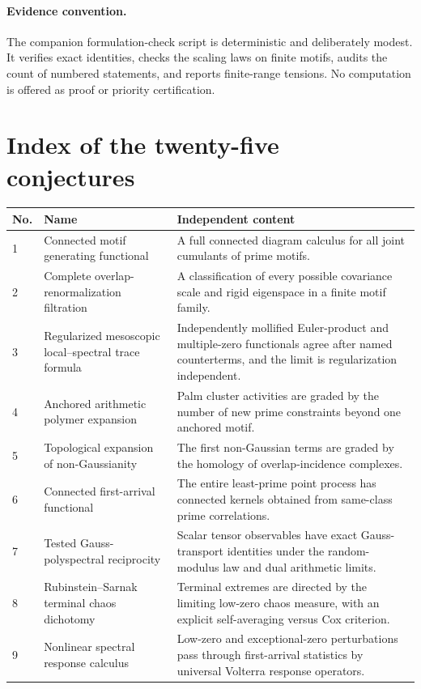 \documentclass[11pt]{article}
\begin{document}
\paragraph{Evidence convention.}
The companion formulation-check script is deterministic and deliberately modest.  It verifies
exact identities, checks the scaling laws on finite motifs, audits the count of
numbered statements, and reports finite-range tensions.  No computation is offered as proof or
priority certification.

\section{Index of the twenty-five conjectures}

\begin{longtable}{@{}p{}p{}p{}@{}}
\toprule
No. & Name & Independent content \\
\midrule
\endhead
1 & Connected motif generating functional & A full connected diagram calculus for all joint cumulants of prime motifs.\\
2 & Complete overlap-renormalization filtration & A classification of every possible covariance scale and rigid eigenspace in a finite motif family.\\
3 & Regularized mesoscopic local--spectral trace formula & Independently mollified Euler-product and multiple-zero functionals agree after named counterterms, and the limit is regularization independent.\\
4 & Anchored arithmetic polymer expansion & Palm cluster activities are graded by the number of new prime constraints beyond one anchored motif.\\
5 & Topological expansion of non-Gaussianity & The first non-Gaussian terms are graded by the homology of overlap-incidence complexes.\\
6 & Connected first-arrival functional & The entire least-prime point process has connected kernels obtained from same-class prime correlations.\\
7 & Tested Gauss-polyspectral reciprocity & Scalar tensor observables have exact Gauss-transport identities under the random-modulus law and dual arithmetic limits.\\
8 & Rubinstein--Sarnak terminal chaos dichotomy & Terminal extremes are directed by the limiting low-zero chaos measure, with an explicit self-averaging versus Cox criterion.\\
9 & Nonlinear spectral response calculus & Low-zero and exceptional-zero perturbations pass through first-arrival statistics by universal Volterra response operators.\\

\end{longtable}
\end{document}
